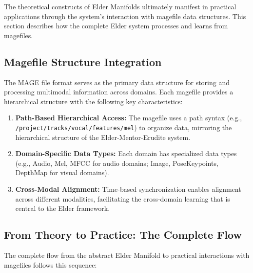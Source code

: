 The theoretical constructs of Elder Manifolds ultimately manifest in practical applications through the system's interaction with magefile data structures. This section describes how the complete Elder system processes and learns from magefiles.

\subsection{Magefile Structure Integration}

The MAGE file format serves as the primary data structure for storing and processing multimodal information across domains. Each magefile provides a hierarchical structure with the following key characteristics:

\begin{enumerate}
    \item \textbf{Path-Based Hierarchical Access:} The magefile uses a path syntax (e.g., \texttt{/project/tracks/vocal/features/mel}) to organize data, mirroring the hierarchical structure of the Elder-Mentor-Erudite system.
    
    \item \textbf{Domain-Specific Data Types:} Each domain has specialized data types (e.g., Audio, Mel, MFCC for audio domains; Image, PoseKeypoints, DepthMap for visual domains).
    
    \item \textbf{Cross-Modal Alignment:} Time-based synchronization enables alignment across different modalities, facilitating the cross-domain learning that is central to the Elder framework.
\end{enumerate}

\subsection{From Theory to Practice: The Complete Flow}

The complete flow from the abstract Elder Manifold to practical interactions with magefiles follows this sequence:

